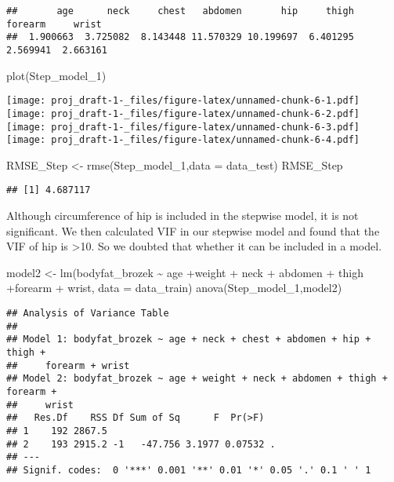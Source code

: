 \documentclass[
]{article}
\newenvironment{Shaded}{\begin{snugshade}}{\end{snugshade}}
\newcommand{\AttributeTok}[1]{\textcolor[rgb]{0.77,0.63,0.00}{#1}}
\newcommand{\FunctionTok}[1]{\textcolor[rgb]{0.00,0.00,0.00}{#1}}
\newcommand{\NormalTok}[1]{#1}
\newcommand{\OtherTok}[1]{\textcolor[rgb]{0.56,0.35,0.01}{#1}}
\newcommand{\SpecialCharTok}[1]{\textcolor[rgb]{0.00,0.00,0.00}{#1}}
\begin{document}
\begin{verbatim}
##       age      neck     chest   abdomen       hip     thigh   forearm     wrist 
##  1.900663  3.725082  8.143448 11.570329 10.199697  6.401295  2.569941  2.663161
\end{verbatim}

\begin{Shaded}
\begin{Highlighting}[]
\FunctionTok{plot}\NormalTok{(Step\_model\_1)}
\end{Highlighting}
\end{Shaded}

\texttt{[image: proj\_draft-1-\_files/figure-latex/unnamed-chunk-6-1.pdf]}
\texttt{[image: proj\_draft-1-\_files/figure-latex/unnamed-chunk-6-2.pdf]}
\texttt{[image: proj\_draft-1-\_files/figure-latex/unnamed-chunk-6-3.pdf]}
\texttt{[image: proj\_draft-1-\_files/figure-latex/unnamed-chunk-6-4.pdf]}

\begin{Shaded}
\begin{Highlighting}[]
\NormalTok{RMSE\_Step }\OtherTok{\textless{}{-}} \FunctionTok{rmse}\NormalTok{(Step\_model\_1,}\AttributeTok{data =}\NormalTok{ data\_test)}
\NormalTok{RMSE\_Step}
\end{Highlighting}
\end{Shaded}

\begin{verbatim}
## [1] 4.687117
\end{verbatim}

Although circumference of hip is included in the stepwise model, it is
not significant. We then calculated VIF in our stepwise model and found
that the VIF of hip is \textgreater10. So we doubted that whether it can
be included in a model.

\begin{Shaded}
\begin{Highlighting}[]
\NormalTok{model2 }\OtherTok{\textless{}{-}} \FunctionTok{lm}\NormalTok{(bodyfat\_brozek }\SpecialCharTok{\textasciitilde{}}\NormalTok{ age  }\SpecialCharTok{+}\NormalTok{weight }\SpecialCharTok{+}\NormalTok{ neck }\SpecialCharTok{+}\NormalTok{ abdomen  }\SpecialCharTok{+}\NormalTok{ thigh  }\SpecialCharTok{+}\NormalTok{forearm }\SpecialCharTok{+}\NormalTok{ wrist, }\AttributeTok{data =}\NormalTok{ data\_train)}
\FunctionTok{anova}\NormalTok{(Step\_model\_1,model2)}
\end{Highlighting}
\end{Shaded}

\begin{verbatim}
## Analysis of Variance Table
## 
## Model 1: bodyfat_brozek ~ age + neck + chest + abdomen + hip + thigh + 
##     forearm + wrist
## Model 2: bodyfat_brozek ~ age + weight + neck + abdomen + thigh + forearm + 
##     wrist
##   Res.Df    RSS Df Sum of Sq      F  Pr(>F)  
## 1    192 2867.5                              
## 2    193 2915.2 -1   -47.756 3.1977 0.07532 .
## ---
## Signif. codes:  0 '***' 0.001 '**' 0.01 '*' 0.05 '.' 0.1 ' ' 1
\end{verbatim}
\end{document}

